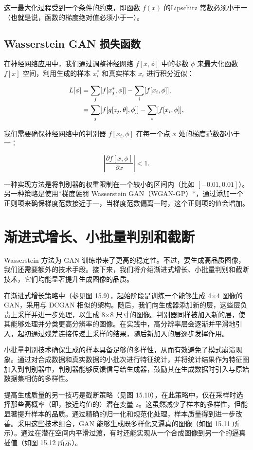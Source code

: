 \documentclass[lang=cn,newtx,10pt,scheme=chinese]{elegantbook}
\begin{document}
这一最大化过程受到一个条件的约束，即函数 \(f(x)\) 的Lipschitz 常数必须小于一（也就是说，函数的梯度绝对值必须小于一）。

\subsection{Wasserstein GAN 损失函数}
在神经网络应用中，我们通过调整神经网络 \(f[x, \phi]\) 中的参数 \(\phi\) 来最大化函数 \(f[x]\) 空间，利用生成的样本 \(x_i^*\) 和真实样本 \(x_i\) 进行积分近似：


\begin{align}
L[\phi] &= \sum_j [f[x_j^*, \phi]] - \sum_i [f[x_i, \phi]], \notag \\
&= \sum_j [f[g[z_j, \theta], \phi]] - \sum_i [f[x_i, \phi]], 
\end{align} 


我们需要确保神经网络中的判别器 \(f[x_i, \phi]\) 在每一个点 \(x\) 处的梯度范数都小于一：

\begin{equation}
\left| \frac{\partial f[x, \phi]}{\partial x} \right| < 1. 
\end{equation}

一种实现方法是将判别器的权重限制在一个较小的区间内（比如 \([-0.01, 0.01]\)）。另一种策略是使用*梯度惩罚 Wasserstein GAN（WGAN-GP）*，通过添加一个正则项来确保梯度范数接近于一，当梯度范数偏离一时，这个正则项的值会增加。

\section{渐进式增长、小批量判别和截断}
Wasserstein 方法为 GAN 训练带来了更高的稳定性。不过，要生成高品质图像，我们还需要额外的技术手段。接下来，我们将介绍渐进式增长、小批量判别和截断技术，它们均能显著提升生成图像的品质。

在渐进式增长策略中（参见图 15.9），起始阶段是训练一个能够生成 4×4 图像的 GAN，采用与 DCGAN 相似的架构。随后，我们向生成器添加新的层，这些层负责上采样并进一步处理，以生成 8×8 尺寸的图像。判别器同样被加入新的层，使其能够处理并分类更高分辨率的图像。在实践中，高分辨率层会逐渐并平滑地引入，起初通过残差连接传递上采样的结果，随后新加入的层逐步发挥作用。

小批量判别技术确保生成的样本具备足够的多样性，从而有效避免了模式崩溃现象。通过对合成数据和真实数据的小批次进行特征统计，并将统计结果作为特征图加入到判别器中，判别器能够反馈信号给生成器，鼓励其在生成数据时引入与原始数据集相仿的多样性。

提高生成质量的另一技巧是截断策略（见图 15.10），在此策略中，仅在采样时选择那些高概率（即，接近均值的）潜在变量 z。这虽然减少了样本的多样性，但能显著提升样本的品质。通过精确的归一化和规范化处理，样本质量得到进一步改善。采用这些技术组合，GAN 能够生成既多样化又逼真的图像（如图 15.11 所示）。通过在潜在空间内平滑过渡，有时还能实现从一个合成图像到另一个的逼真插值（如图 15.12 所示）。
\end{document}

